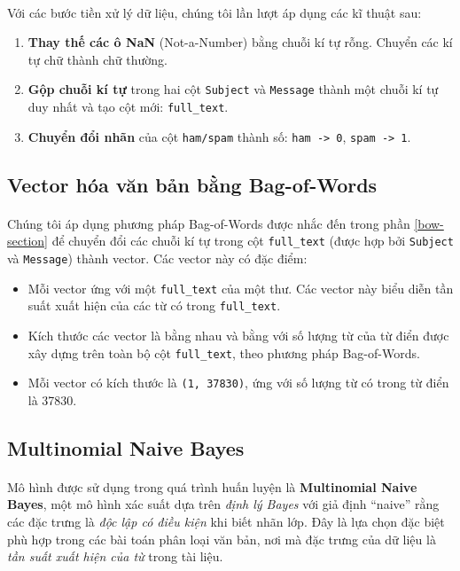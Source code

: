 {\paragraph{}{Với các bước tiền xử lý dữ liệu, chúng tôi lần lượt áp dụng các kĩ thuật sau:}

\begin{enumerate}
    \item \textbf{Thay thế các ô NaN} (Not-a-Number) bằng chuỗi kí tự rỗng. Chuyển các kí tự chữ thành chữ thường.
    \item \textbf{Gộp chuỗi kí tự} trong hai cột \texttt{Subject} và \texttt{Message} thành một chuỗi kí tự duy nhất và tạo cột mới: \texttt{full\_text}.
    \item \textbf{Chuyển đổi nhãn} của cột \texttt{ham/spam} thành số: \texttt{ham -> 0}, \texttt{spam -> 1}.
\end{enumerate}

\subsection{Vector hóa văn bản bằng Bag-of-Words}

\paragraph{}{Chúng tôi áp dụng phương pháp Bag-of-Words được nhắc đến trong phần \ref{bow-section} để chuyển đổi các chuỗi kí tự trong cột \texttt{full\_text} (được hợp bởi \texttt{Subject} và \texttt{Message}) thành vector. Các vector này có đặc điểm:}

\begin{itemize}
    \item Mỗi vector ứng với một \texttt{full\_text} của một thư. Các vector này biểu diễn tần suất xuất hiện của các từ có trong \texttt{full\_text}.
    \item Kích thước các vector là bằng nhau và bằng với số lượng từ của từ điển được xây dựng trên toàn bộ cột \texttt{full\_text}, theo phương pháp Bag-of-Words.
    \item Mỗi vector có kích thước là \texttt{(1, 37830)}, ứng với số lượng từ có trong từ điển là 37830.
\end{itemize}

\subsection{Multinomial Naive Bayes}
\paragraph{}{Mô hình được sử dụng trong quá trình huấn luyện là \textbf{Multinomial Naive Bayes}, một mô hình xác suất dựa trên \textit{định lý Bayes} với giả định ``naive'' rằng các đặc trưng là \textit{độc lập có điều kiện} khi biết nhãn lớp. Đây là lựa chọn đặc biệt phù hợp trong các bài toán phân loại văn bản, nơi mà đặc trưng của dữ liệu là \textit{tần suất xuất hiện của từ} trong tài liệu.}

}
